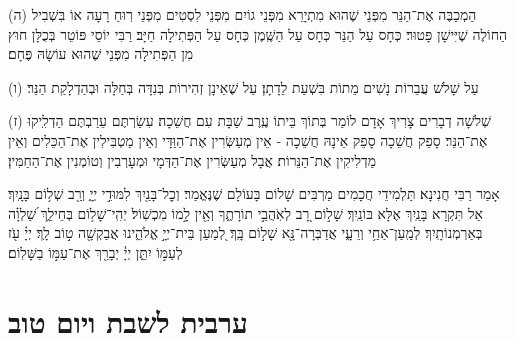 \documentclass[twoside, openany, parskip=half, 11pt]{book}
\begin{document}
(ה) הַמְכַבֶּה אֶת־הַנֵּר מִפְּנֵי שֶׁהוּא מִתְיָרֵא מִפְּנֵי גוֹיִם מִפְּנֵי לִסְטִים מִפְּנֵי רֽוּחַ רָעָה אוֹ בִּשְׁבִיל הַחוֹלֶה שֶׁיִּישָׁן פָּטוּר׃ כְּחָס עַל הַנֵּר כְּחָס עַל הַשֶּֽׁמֶן כְּחָס עַל הַפְּתִילָה חַיָּב׃ רַבִּי יוֹסֵי פּוֹטֵר בְּכֻלָּן חוּץ מִן הַפְּתִילָה מִפְּנֵי שֶׁהוּא עוֹשָׂהּ פֶּחָם׃

(ו) עַל שָׁלֹשׁ עֲבֵרוֹת נָשִׁים מֵתוֹת בִּשְׁעַת לֵדָתָן׃ עַל שֶׁאֵינָן זְהִירוֹת בְּנִדָּה בְּחַלָּה וּבְהַדְלָקַת הַנֵּר׃

(ז) שְׁלֹשָׁה דְבָרִים צָרִיךְ אָדָם לוֹמַר בְּתוֹךְ בֵּיתוֹ עֶֽרֶב שַׁבָּת עִם חֲשֵׁכָה׃ עִשַׂרְתֶּם עֵרַבְתֶּם הַדְלִֽיקוּ אֶת־הַנֵּר׃ סָפֵק חֲשֵׁכָה סָפֵק אֵינָהּ חֲשֵׁכָה - אֵין מְעַשְּׂרִין אֶת־הַוַּדָּי וְאֵין מַטְבִּילִין אֶת־הַכֵּלִים וְאֵין מַדְלִיקִין אֶת־הַנֵּרוֹת׃ אֲבָל מְעַשְּׂרִין אֶת־הַדְּמָי וּמְעָרְבִין וְטוֹמְנִין אֶת־הַחַמִּין׃


 
אָמַר רַבִּי חֲנִינָא׃ תַּלְמִידֵי חֲכָמִים מַרְבִּים שָׁלוֹם בָּעוֹלָם שֶׁנֶּאֱמַר׃
וְכׇל־בָּנַ֖יִךְ לִמּוּדֵ֣י יְיָ֑ וְרַ֖ב שְׁל֥וֹם בָּנָֽיִךְ׃ אַל תִּקְרָא בָּנַֽיִךְ אֶלָּא בּוֹנַֽיִךְ׃ שָׁל֣וֹם רָ֭ב לְאֹֽהֲבֵ֣י תוֹרָתֶ֑ךָ וְאֵ֖ין לָ֣מוֹ מִכְשֽׁוֹל׃ יְהִֽי־שָׁל֥וֹם בְּחֵילֵ֑ךְ שַׁ֝לְוָ֗ה בְּאַרְמְנוֹתָֽיִךְ׃ לְמַֽעַן־אַחַ֥י וְרֵעָ֑י אֲדַבְּרָה־נָּ֖א שָׁל֣וֹם בָּֽךְ׃ לְ֭מַעַן בֵּית־יְיָ֣ אֱלֹהֵ֑ינוּ אֲבַקְשָׁ֖ה ט֣וֹב לָֽךְ׃
יְיָ֗ עֹ֖ז לְעַמּ֣וֹ יִתֵּ֑ן יְיָ֓ יְבָרֵ֖ךְ אֶת־עַמּ֣וֹ בַשָּׁלֽוֹם׃


\mournerskaddish

\vspace{\baselineskip}

{\let\clearpage\relax
\chapter[ערבית לשבת ויו״ט]{ ערבית לשבת ויום טוב }}
\newcommand{\hamaarivaravim}{
\firstword{בָּרוּךְ}
אַתָּה יְיָ אֱלֹהֵֽינוּ מֶֽלֶךְ הָעוֹלָם אֲשֶׁר בִּדְבָרוֹ מַעֲרִיב עֲרָבִים בְּחׇכְמָה פּוֹתֵֽחַ שְׁעָרִים וּבִתְבוּנָה מְשַׁנֶּה עִתִּים וּמַחֲלִיף אֶת־הַזְּמַנִּים וּמְסַדֵּר אֶת־הַכּוֹכָבִים בְּמִשְׁמְרוֹתֵֽיהֶם בָּרָקִֽיעַ כִּרְצוֹנוֹ׃ בּוֹרֵא יוֹם וָלָֽיְלָה גּוֹלֵל אוֹר מִפְּנֵי חֹֽשֶׁךְ וְחֹֽשֶׁךְ מִפְּנֵי אוֹר׃ וּמַעֲבִיר יוֹם וּמֵֽבִיא לָֽיְלָה וּמַבְדִּיל בֵּין יוֹם וּבֵין לָֽיְלָה יְיָ צְבָאוֹת שְׁמוֹ׃ אֵל חַי וְקַיָּם תָּמִיד יִמְלוֹךְ עָלֵֽינוּ לְעוֹלָם וָעֶד׃ בָּרוּךְ אַתָּה יְיָ הַמַּעֲרִיב עֲרָבִים׃
}
\end{document}
